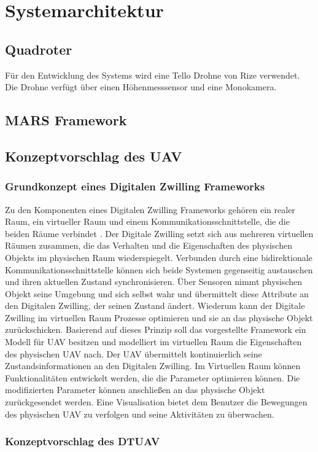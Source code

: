\section{Systemarchitektur}

\subsection{Quadroter}
Für den Entwicklung des Systems wird eine Tello Drohne von Rize verwendet. Die Drohne verfügt über einen Höhenmesssensor und eine Monokamera.




\subsection{MARS Framework}

\subsection{Konzeptvorschlag des UAV}

\subsubsection{Grundkonzept eines Digitalen Zwilling Frameworks}

Zu den Komponenten eines Digitalen Zwilling Frameworks gehören ein realer Raum, ein virtueller Raum und einem Kommunikationsschnittstelle, die die beiden Räume verbindet \cite{Gri2016OriOfTheDigTwiCon}. Der Digitale Zwilling setzt sich aus mehreren virtuellen Räumen zusammen, die das Verhalten und die Eigenschaften des physischen Objekts im physischen Raum wiederspiegelt.
Verbunden durch eine bidirektionale Kommunikationsschnittstelle können sich beide Systemen gegenseitig austauschen und ihren aktuellen Zustand synchronisieren. Über Sensoren nimmt physischen Objekt seine Umgebung und sich selbst wahr und übermittelt diese Attribute an den Digitalen Zwilling, der seinen Zustand ändert. Wiederum kann der Digitale Zwilling im virtuellen Raum Prozesse optimieren und sie an das physische Objekt zurückschicken.
Basierend auf dieses Prinzip soll das vorgestellte Framework ein Modell für UAV besitzen und modelliert im virtuellen Raum die Eigenschaften des physischen UAV nach. Der UAV übermittelt kontinuierlich seine Zustandsinformationen an den Digitalen Zwilling.
Im Virtuellen Raum können Funktionalitäten entwickelt werden, die die Parameter optimieren können. Die modifizierten Parameter können anschließen an das physische Objekt zurückgesendet werden. Eine Visualisation bietet dem Benutzer die Bewegungen des physischen UAV zu verfolgen und seine Aktivitäten zu überwachen.





\subsubsection{Konzeptvorschlag des DTUAV}

